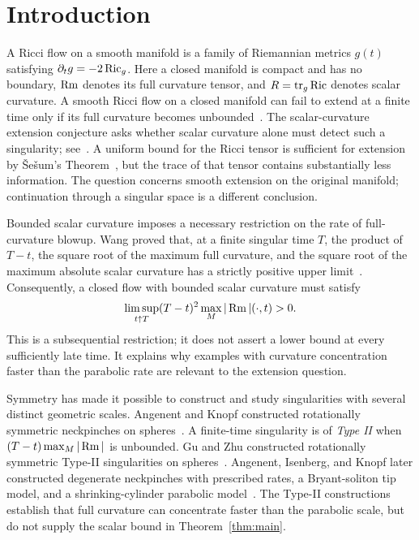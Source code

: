 \begin{abstract}
We disprove the scalar-curvature extension conjecture in its unrestricted
all-dimensions form. In sufficiently high dimension, we construct a Ricci
flow on a closed manifold whose scalar curvature remains uniformly bounded
while full curvature diverges at a finite maximal time. In one fixed
sufficiently high dimension, the examples have two-sided power-law curvature
blowup with arbitrarily large exponents.
\end{abstract}

\section{Introduction}

A Ricci flow on a smooth manifold is a family of Riemannian metrics
\(g(t)\) satisfying \(\partial_tg=-2\operatorname{Ric}_g\). Here a closed manifold
is compact and has no boundary, \(\operatorname{Rm}\) denotes its full curvature
tensor, and \(R=\operatorname{tr}_g\operatorname{Ric}\) denotes scalar curvature.
A smooth Ricci flow on a closed manifold can fail to extend at a finite time
only if its full curvature becomes unbounded~\cite{Hamilton1995}.
The scalar-curvature extension conjecture asks whether scalar curvature
alone must detect such a singularity; see~\cite[p.~756]{Bamler2018}.
A uniform bound for the Ricci tensor is sufficient for extension
by \v{S}e\v{s}um's Theorem~\cite{Sesum2005}, but the trace of that tensor
contains substantially less information. The question concerns smooth
extension on the original manifold; continuation through a singular space
is a different conclusion.

Bounded scalar curvature imposes a necessary restriction on the rate of
full-curvature blowup. Wang proved that, at a finite singular time \(T\),
the product of \(T-t\), the square root of the maximum full curvature,
and the square root of the maximum absolute scalar curvature has a
strictly positive upper limit~\cite[Theorem~3]{Wang2012}.
Consequently, a closed flow with bounded scalar curvature must satisfy
\[
\limsup_{t\uparrow T}(T-t)^2\max_M|\operatorname{Rm}|(\cdot,t)>0.
\]
This is a subsequential restriction; it does not assert a lower bound at
every sufficiently late time. It explains why examples with curvature
concentration faster than the parabolic rate are relevant to the
extension question.

Symmetry has made it possible to construct and study singularities with
several distinct geometric scales. Angenent and Knopf constructed
rotationally symmetric neckpinches on spheres~\cite{AK2004}.
A finite-time singularity is of
\emph{Type II} when \((T-t)\max_M|\operatorname{Rm}|\) is unbounded.
Gu and Zhu constructed rotationally symmetric Type-II singularities on
spheres~\cite{GuZhu2008}. Angenent, Isenberg, and Knopf later constructed
degenerate neckpinches with prescribed rates, a Bryant-soliton tip model,
and a shrinking-cylinder parabolic model~\cite{AIK2015}.
The Type-II constructions establish that full curvature can concentrate faster
than the parabolic scale, but do not supply the scalar bound in
Theorem~\ref{thm:main}.

